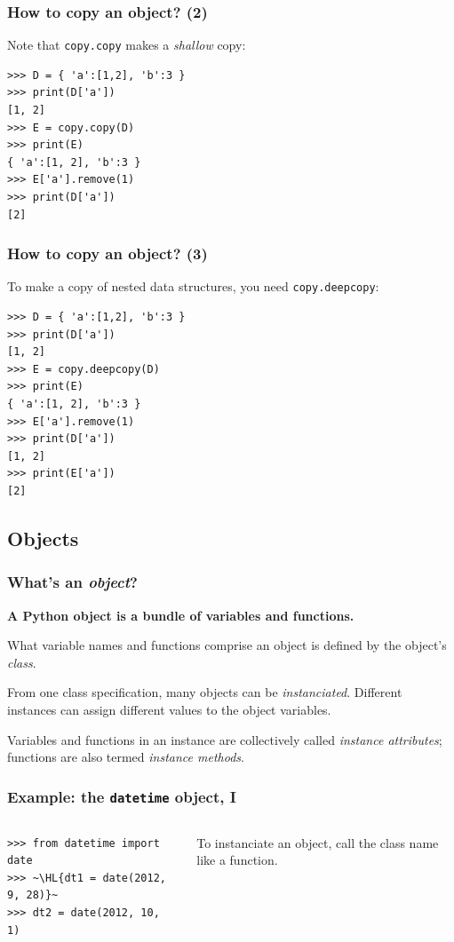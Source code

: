 \documentclass[english,serif,mathserif,xcolor=pdftex,dvipsnames,table]{beamer}
\begin{document}
\begin{frame}[fragile]
  \frametitle{How to copy an object? (2)}
Note that \texttt{copy.copy} makes a \emph{shallow} copy:
  \begin{lstlisting}
>>> D = { 'a':[1,2], 'b':3 }
>>> print(D['a'])
[1, 2]
>>> E = copy.copy(D)
>>> print(E)
{ 'a':[1, 2], 'b':3 }
>>> E['a'].remove(1)
>>> print(D['a'])
[2]
  \end{lstlisting}
\end{frame}


\begin{frame}[fragile]
  \frametitle{How to copy an object? (3)}
To make a copy of nested data structures, you need \texttt{copy.deepcopy}:
  \begin{lstlisting}
>>> D = { 'a':[1,2], 'b':3 }
>>> print(D['a'])
[1, 2]
>>> E = copy.deepcopy(D)
>>> print(E)
{ 'a':[1, 2], 'b':3 }
>>> E['a'].remove(1)
>>> print(D['a'])
[1, 2]
>>> print(E['a'])
[2]
  \end{lstlisting}
\end{frame}


\subsection{Objects}

\begin{frame}
  \frametitle{What's an \emph{object}?}
  \textbf{A Python object is a bundle of variables and functions.}

  \+
  What variable names and functions comprise an object is defined
  by the object's \emph{class}.

  \+
  From one class specification, many objects can be
  \emph{instanciated}.  Different instances can assign different
  values to the object variables.

  \+
  Variables and functions in an instance are collectively called
  \emph{instance attributes}; functions are also termed \emph{instance
    methods}.
\end{frame}


\begin{frame}[fragile]
  \frametitle{Example: the \texttt{datetime} object, I}
  \begin{columns}[c]
    \begin{column}{0.5\textwidth}
\begin{lstlisting}
>>> from datetime import date
>>> ~\HL{dt1 = date(2012, 9, 28)}~
>>> dt2 = date(2012, 10, 1)
\end{lstlisting}
    \end{column}
    \begin{column}{0.5\textwidth}
      \raggedleft
      To instanciate an object, call the class name like a
      function.
    \end{column}
  \end{columns}
\end{frame}
\end{document}
